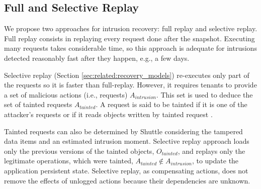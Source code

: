 

\subsection{Full and Selective Replay}
\label{sec:arch:selective_replay}

We propose two approaches for intrusion recovery: full replay and selective replay. Full replay consists in replaying every request done after the  snapshot. Executing many requests takes considerable time, so this approach is adequate for intrusions detected reasonably fast after they happen, e.g., a few days. 


Selective replay (Section \ref{sec:related:recovery_models})  re-executes only part of the requests so it is faster than full-replay. However, it requires tenants to provide a set of malicious actions (i.e., requests) $A_{intrusion}$. This set is used to deduce the set of tainted requests $A_{tainted}$. A request is said to be tainted if it is one of the attacker’s requests or if it reads objects written by tainted request \cite{taser,itdb,phoenix}.  

Tainted requests can also be determined by Shuttle considering the tampered data items and an estimated intrusion moment. Selective replay approach loads only the previous versions of the tainted objects, $O_{tainted}$, and replays only the legitimate operations, which were tainted, $A_{tainted} \notin A_{intrusion}$, to update the application persistent state. Selective replay, as compensating actions, does not remove the effects of unlogged actions because their dependencies are unknown. 

